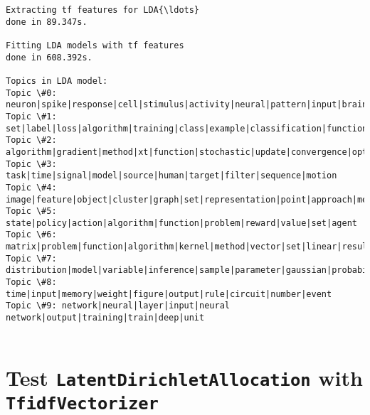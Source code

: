 \documentclass[11pt]{article}
\begin{document}
    \begin{Verbatim}[commandchars=\\\{\}]
Extracting tf features for LDA{\ldots}
done in 89.347s.

Fitting LDA models with tf features
done in 608.392s.

Topics in LDA model:
Topic \#0: neuron|spike|response|cell|stimulus|activity|neural|pattern|input|brain
Topic \#1: set|label|loss|algorithm|training|class|example|classification|function|classifier
Topic \#2: algorithm|gradient|method|xt|function|stochastic|update|convergence|optimization|parameter
Topic \#3: task|time|signal|model|source|human|target|filter|sequence|motion
Topic \#4: image|feature|object|cluster|graph|set|representation|point|approach|method
Topic \#5: state|policy|action|algorithm|function|problem|reward|value|set|agent
Topic \#6: matrix|problem|function|algorithm|kernel|method|vector|set|linear|result
Topic \#7: distribution|model|variable|inference|sample|parameter|gaussian|probability|prior|latent
Topic \#8: time|input|memory|weight|figure|output|rule|circuit|number|event
Topic \#9: network|neural|layer|input|neural network|output|training|train|deep|unit


    \end{Verbatim}

    \section{\texorpdfstring{Test \texttt{LatentDirichletAllocation} with
\texttt{TfidfVectorizer}}{Test LatentDirichletAllocation with TfidfVectorizer}}\label{test-latentdirichletallocation-with-tfidfvectorizer}
\end{document}
